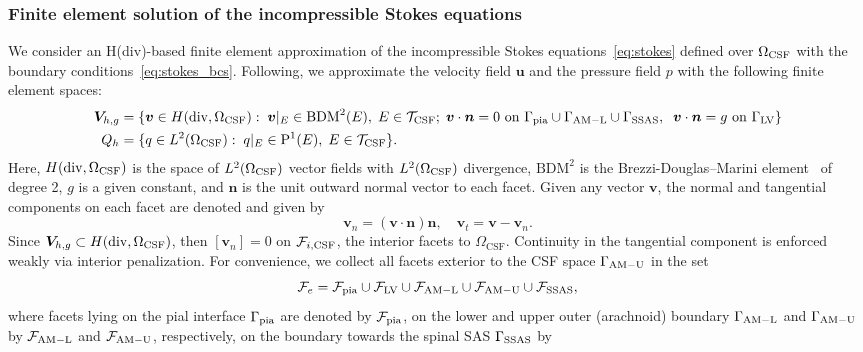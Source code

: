 \documentclass[fleqn,10pt]{wlscirep}
\begin{document}
\subsubsection{Finite element solution of the incompressible Stokes equations}
We consider an H(div)-based finite element approximation of the incompressible Stokes equations~\eqref{eq:stokes} defined over $\Omega_{\rm CSF}$ with the boundary conditions~\eqref{eq:stokes_bcs}. Following\cite{hong2016robust}, we approximate the velocity field $\bm u$ and the pressure field $p$ with the following finite element spaces:
\begin{align*}
  \bm V_{h,g} &= \{ \bm v  \in H(\mathrm{div}, \Omega_{\mathrm{CSF}}): \;
  \bm v \vert_{E} \in \mathrm{BDM}^2(E), \; E \in \mathcal{T}_{\rm CSF}; \;
  \bm v \cdot \bm n = 0
  \text{ on } \Gamma_{\rm{pia}} \cup \Gamma_{\rm AM-L} \cup \Gamma_{\rm{SSAS}}, \;\; \bm v \cdot \bm n =  g %
  \text{ on } \Gamma_{\mathrm{LV}} \}  \\ 
  Q_h  &= \{q \in L^2(\Omega_{\rm CSF}): \; q \vert_E \in \mathrm{P}^1(E),
  \; E \in \mathcal{T}_{\rm CSF} \}. 
\end{align*}
Here, $H(\mathrm{div}, \Omega_{\rm{CSF}})$ is the space of $L^2(\Omega_{\rm{CSF}})$ vector fields with $L^2(\Omega_{\rm{CSF}})$ divergence, $\mathrm{BDM}^2$ is the Brezzi-Douglas--Marini element~\cite{brezzi1987mixed} of degree 2, $g$ is a given constant, and $\bm n$ is the unit outward normal vector to each facet. Given any vector $\bm v$, the normal and tangential components on each facet are denoted and given by 
$$ \bm v_n = (\bm v \cdot \bm n) \bm n, \quad \bm v_t = \bm v - \bm v_n. 
$$ 
Since $\bm V_{h,g} \subset H(\mathrm{div}, \Omega_{\rm CSF})$, then $[\bm
  v_n] = 0 $ on $\mathcal{F}_{i, \rm CSF}$, the interior facets to $\Omega_{\mathrm{CSF}}$. Continuity in the
tangential component is enforced weakly via interior penalization. For
convenience, we collect all facets exterior to the CSF space  $\Gamma_{\rm AM-U}$ in the set
$$\mathcal{F}_{e} = \mathcal{F}_{\rm pia} \cup \mathcal{F}_{\rm LV}
\cup \mathcal{F}_{\rm AM-L}\cup \mathcal{F}_{\rm AM-U}  \cup \mathcal{F}_{\rm SSAS}, $$ 
where facets
lying on the pial interface $\Gamma_{\rm pia}$ are denoted by
$\mathcal{F}_{\rm pia}$, on the lower and upper outer (arachnoid) boundary
$\Gamma_{\rm AM-L}$ and $\Gamma_{\rm AM-U}$ by $\mathcal{F}_{\rm AM-L}$ and $\mathcal{F}_{\rm AM-U}$, respectively, 
 on the boundary towards the spinal SAS $\Gamma_{\rm SSAS}$ by
\end{document}
